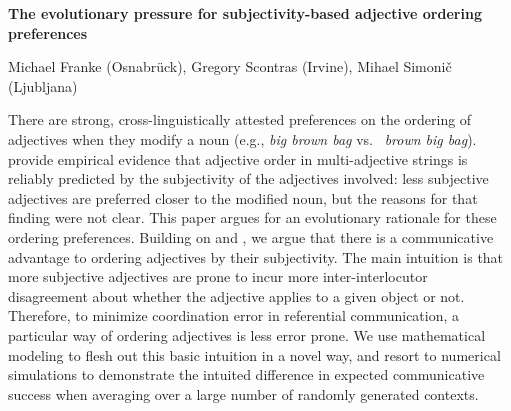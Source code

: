 \documentclass[12pt]{article}
\begin{document}
\setlength{\abovedisplayskip}{0.5pt}
\setlength{\belowdisplayskip}{0.5pt}


\begin{center}
	\textbf{The evolutionary pressure for subjectivity-based adjective ordering preferences}
  \vspace*{-0.4cm}
  \begin{flushright}
  {\footnotesize Michael Franke (Osnabr\"uck), Gregory Scontras (Irvine), Mihael Simoni\v{c} (Ljubljana)}
\end{flushright}
\end{center}

\vspace{-5pt}

\noindent 
There are strong, cross-linguistically attested preferences on the ordering of adjectives when
they modify a noun (e.g., \emph{big brown bag} vs.~ \emph{brown big bag}).
\cite{scontrasetal2017adjectives} provide empirical evidence that adjective order in
multi-adjective strings is reliably predicted by the subjectivity of the adjectives involved:
less subjective adjectives are preferred closer to the modified noun, but the reasons for that
finding were not clear. This paper argues for an evolutionary rationale for these ordering
preferences. Building on \cite{scontrasetalSPadjectives} and \cite{simonic2018}, we argue that
there is a communicative advantage to ordering adjectives by their subjectivity. The main
intuition is that more subjective adjectives are prone to incur more inter-interlocutor
disagreement about whether the adjective applies to a given object or not. Therefore, to
minimize coordination error in referential communication, a particular way of ordering
adjectives is less error prone. We use mathematical modeling to flesh out this basic intuition
in a novel way, and resort to numerical simulations to demonstrate the intuited difference in
expected communicative success when averaging over a large number of randomly generated
contexts.
\end{document}
